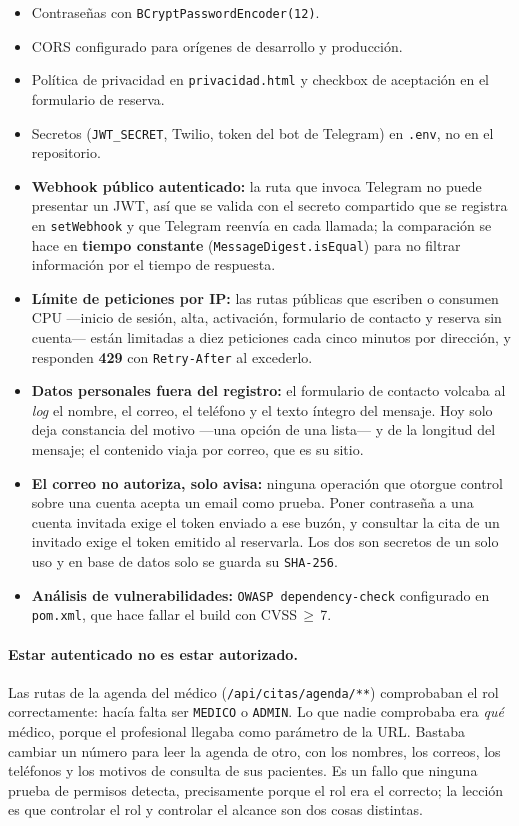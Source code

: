 \documentclass[12pt,a4paper]{report}
\begin{document}
\begin{itemize}
  \item Contraseñas con \texttt{BCryptPasswordEncoder(12)}.
  \item CORS configurado para orígenes de desarrollo y producción.
  \item Política de privacidad en \texttt{privacidad.html} y checkbox de aceptación en el formulario de reserva.
  \item Secretos (\texttt{JWT\_SECRET}, Twilio, token del bot de Telegram) en \texttt{.env}, no en el repositorio.
  \item \textbf{Webhook público autenticado:} la ruta que invoca Telegram no puede presentar un JWT, así que se valida con el secreto compartido que se registra en \texttt{setWebhook} y que Telegram reenvía en cada llamada; la comparación se hace en \textbf{tiempo constante} (\texttt{MessageDigest.isEqual}) para no filtrar información por el tiempo de respuesta.
  \item \textbf{Límite de peticiones por IP:} las rutas públicas que escriben o consumen CPU —inicio de sesión, alta, activación, formulario de contacto y reserva sin cuenta— están limitadas a diez peticiones cada cinco minutos por dirección, y responden \textbf{429} con \texttt{Retry-After} al excederlo.
  \item \textbf{Datos personales fuera del registro:} el formulario de contacto volcaba al \emph{log} el nombre, el correo, el teléfono y el texto íntegro del mensaje. Hoy solo deja constancia del motivo —una opción de una lista— y de la longitud del mensaje; el contenido viaja por correo, que es su sitio.
  \item \textbf{El correo no autoriza, solo avisa:} ninguna operación que otorgue control sobre una cuenta acepta un email como prueba. Poner contraseña a una cuenta invitada exige el token enviado a ese buzón, y consultar la cita de un invitado exige el token emitido al reservarla. Los dos son secretos de un solo uso y en base de datos solo se guarda su \texttt{SHA-256}.
  \item \textbf{Análisis de vulnerabilidades:} \texttt{OWASP dependency-check} configurado en \texttt{pom.xml}, que hace fallar el build con CVSS\,$\geq$\,7.
\end{itemize}

\paragraph{Estar autenticado no es estar autorizado.} Las rutas de la agenda del médico (\texttt{/api/citas/agenda/**}) comprobaban el rol correctamente: hacía falta ser \texttt{MEDICO} o \texttt{ADMIN}. Lo que nadie comprobaba era \emph{qué} médico, porque el profesional llegaba como parámetro de la URL. Bastaba cambiar un número para leer la agenda de otro, con los nombres, los correos, los teléfonos y los motivos de consulta de sus pacientes. Es un fallo que ninguna prueba de permisos detecta, precisamente porque el rol era el correcto; la lección es que controlar el rol y controlar el alcance son dos cosas distintas.
\end{document}
